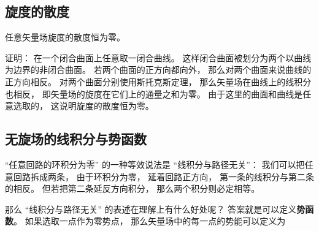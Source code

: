 \subsection{旋度的散度}
\begin{theorem}{}
任意矢量场旋度的散度恒为零。
\end{theorem}
证明： 在一个闭合曲面上任意取一闭合曲线。 这样闭合曲面被划分为两个以曲线为边界的非闭合曲面。 若两个曲面的正方向都向外， 那么对两个曲面来说曲线的正方向相反。 对两个曲面分别使用斯托克斯定理， 那么矢量场在曲线上的线积分也相反， 即矢量场的旋度在它们上的通量之和为零。 由于这里的曲面和曲线是任意选取的， 这说明旋度的散度恒为零。

\subsection{无旋场的线积分与势函数}
“任意回路的环积分为零” 的一种等效说法是 “线积分与路径无关”： 我们可以把任意回路拆成两条， 由于环积分为零， 延着回路正方向， 第一条的线积分与第二条的相反。 但若把第二条延反方向积分， 那么两个积分则必定相等。

那么 “线积分与路径无关” 的表述在理解上有什么好处呢？ 答案就是可以定义\textbf{势函数}。 如果选取一点作为零势点， 那么矢量场中的每一点的势能可以定义为
